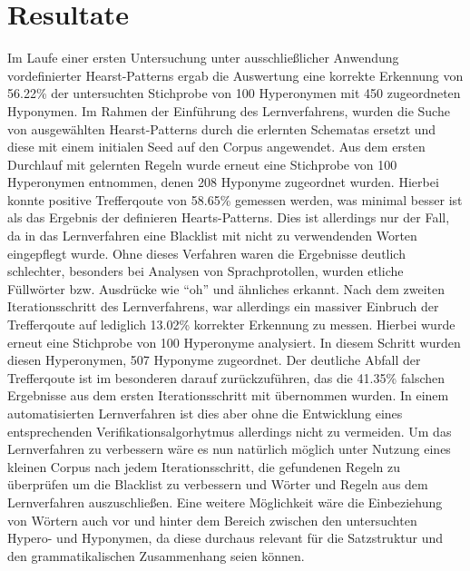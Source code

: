 \section{Resultate}%
Im Laufe einer ersten Untersuchung unter ausschließlicher Anwendung 
vordefinierter Hearst-Patterns ergab die Auswertung eine korrekte
Erkennung von 56.22\% der untersuchten Stichprobe von 100 Hyperonymen mit
450 zugeordneten Hyponymen. Im Rahmen der Einführung des Lernverfahrens,
wurden die Suche von ausgewählten Hearst-Patterns durch die erlernten 
Schematas ersetzt und diese mit einem initialen Seed auf den Corpus 
angewendet. Aus dem ersten Durchlauf mit gelernten Regeln wurde erneut
eine Stichprobe von 100 Hyperonymen entnommen, denen 208 Hyponyme 
zugeordnet wurden. Hierbei konnte positive Trefferqoute von 58.65\% 
gemessen werden, was minimal besser ist als das Ergebnis der definieren
Hearts-Patterns. Dies ist allerdings nur der Fall, da in das Lernverfahren
eine Blacklist mit nicht zu verwendenden Worten eingepflegt wurde. Ohne
dieses Verfahren waren die Ergebnisse deutlich schlechter, besonders bei
Analysen von Sprachprotollen, wurden etliche Füllwörter bzw. Ausdrücke 
wie ``oh'' und ähnliches erkannt. Nach dem zweiten Iterationsschritt des
Lernverfahrens, war allerdings ein massiver Einbruch der Trefferqoute auf
lediglich 13.02\% korrekter Erkennung zu messen. Hierbei wurde erneut eine
Stichprobe von 100 Hyperonyme analysiert. In diesem Schritt wurden diesen
Hyperonymen, 507 Hyponyme zugeordnet. Der deutliche Abfall der Trefferqoute
ist im besonderen darauf zurückzuführen, das die 41.35\% falschen Ergebnisse 
aus dem ersten Iterationsschritt mit übernommen wurden. In einem 
automatisierten Lernverfahren ist dies aber ohne die Entwicklung eines 
entsprechenden Verifikationsalgorhytmus allerdings nicht zu vermeiden.
Um das Lernverfahren zu verbessern wäre es nun natürlich möglich unter 
Nutzung eines kleinen Corpus nach jedem Iterationsschritt, die gefundenen
Regeln zu überprüfen um die Blacklist zu verbessern und Wörter und Regeln
aus dem Lernverfahren auszuschließen. Eine weitere Möglichkeit wäre die 
Einbeziehung von Wörtern auch vor und hinter dem Bereich zwischen den
untersuchten Hypero- und Hyponymen, da diese durchaus relevant für die
Satzstruktur und den grammatikalischen Zusammenhang seien können.
